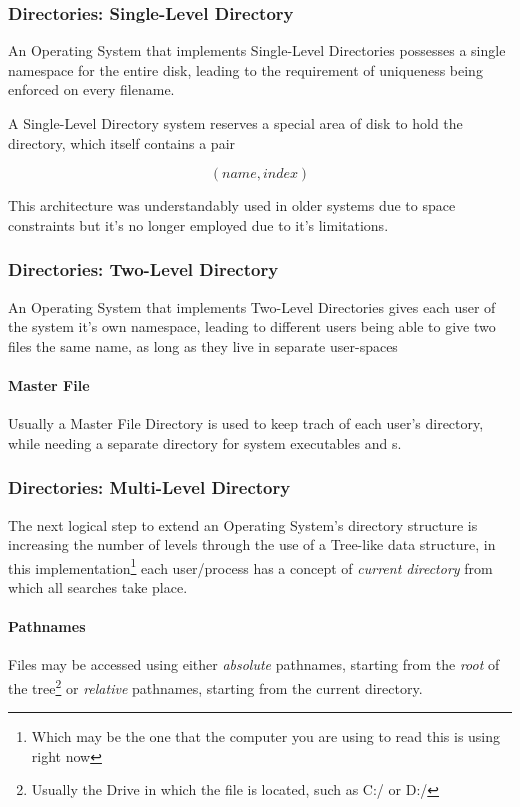 \documentclass[openright, twoside]{report}
\theoremstyle{definition}
\theoremstyle{example}
\begin{document}
\subsubsection{Directories: Single-Level Directory}
An Operating System that implements Single-Level Directories possesses 
a single namespace for the entire disk, leading to the requirement of 
uniqueness being enforced on every filename. 

A Single-Level Directory system reserves a special area of disk to 
hold the directory, which itself contains a pair 

\[(name, index)\]

This architecture was understandably used in older systems due to 
space constraints but it's no longer employed due to it's limitations. 

\subsubsection{Directories: Two-Level Directory}
An Operating System that implements Two-Level Directories gives 
each user of the system it's own namespace, leading to different users
being able to give two files the same name, as long as they live in separate 
user-spaces

\paragraph{Master File}
Usually a Master File Directory is used to keep trach of each user's directory,
while needing a separate directory for system executables and s.

\subsubsection{Directories: Multi-Level Directory}
The next logical step to extend an Operating System's directory structure is 
increasing the number of levels through the use of a Tree-like data structure, 
in this implementation\footnote{Which may be the one that the computer 
you are using to read this is using right now} each user/process has a 
concept of \emph{current directory} from which all searches take place.

\paragraph{Pathnames}
Files may be accessed using either \emph{absolute} pathnames, starting from the 
\emph{root} of the tree\footnote{Usually the Drive in which the file is 
located, such as C:/ or D:/} or \emph{relative} pathnames, starting from 
the current directory.
\end{document}

